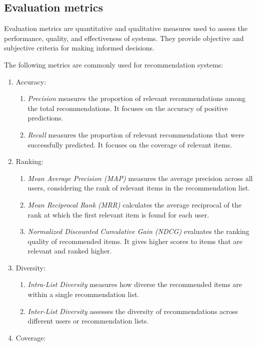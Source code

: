 	\subsection{\textbf{Evaluation metrics}}
		Evaluation metrics are quantitative and qualitative measures used to assess the performance, quality, and effectiveness of systems. They provide objective and subjective criteria for making informed decisions.

		The following metrics are commonly used for recommendation systems:

		\begin{enumerate}
			\item Accuracy:
				\begin{enumerate}
					\item \textit{Precision} measures the proportion of relevant recommendations among the total recommendations. It focuses on the accuracy of positive predictions.
					\item \textit{Recall} measures the proportion of relevant recommendations that were successfully predicted. It focuses on the coverage of relevant items.
				\end{enumerate}
			\item Ranking:
				\begin{enumerate}
					\item \textit{Mean Average Precision (MAP)} measures the average precision across all users, considering the rank of relevant items in the recommendation list.
					\item \textit{Mean Reciprocal Rank (MRR)} calculates the average reciprocal of the rank at which the first relevant item is found for each user.
					\item \textit{Normalized Discounted Cumulative Gain (NDCG)} evaluates the ranking quality of recommended items. It gives higher scores to items that are relevant and ranked higher.
				\end{enumerate}
			\item Diversity:
				\begin{enumerate}
					\item \textit{Intra-List Diversity} measures how diverse the recommended items are within a single recommendation list.
					\item \textit{Inter-List Diversity} assesses the diversity of recommendations across different users or recommendation lists.
				\end{enumerate}
			\item Coverage:
				\begin{enumerate}

\end{enumerate}
\end{enumerate}
